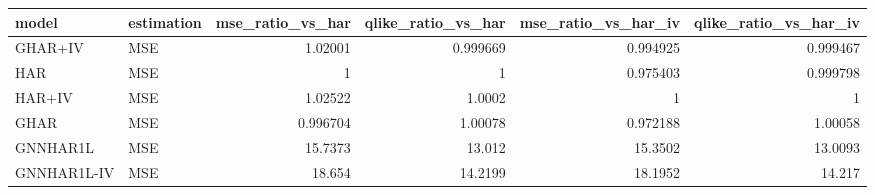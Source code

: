 \begin{tabular}{llrrrr}
\toprule
model & estimation & mse_ratio_vs_har & qlike_ratio_vs_har & mse_ratio_vs_har_iv & qlike_ratio_vs_har_iv \\
\midrule
GHAR+IV & MSE & 1.02001 & 0.999669 & 0.994925 & 0.999467 \\
HAR & MSE & 1 & 1 & 0.975403 & 0.999798 \\
HAR+IV & MSE & 1.02522 & 1.0002 & 1 & 1 \\
GHAR & MSE & 0.996704 & 1.00078 & 0.972188 & 1.00058 \\
GNNHAR1L & MSE & 15.7373 & 13.012 & 15.3502 & 13.0093 \\
GNNHAR1L-IV & MSE & 18.654 & 14.2199 & 18.1952 & 14.217 \\
\bottomrule
\end{tabular}
